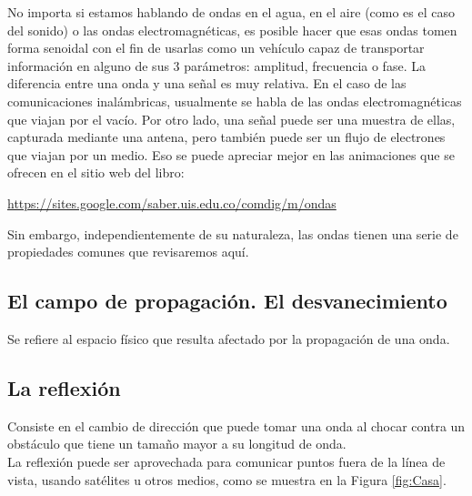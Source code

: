No importa si estamos hablando de ondas en el agua, en el aire (como es el caso del sonido) o las ondas electromagnéticas, es posible hacer que esas ondas tomen forma senoidal con el fin de usarlas como un vehículo capaz de transportar información en alguno de sus 3 parámetros: amplitud, frecuencia o fase. La diferencia entre una onda y una señal es muy relativa. En el caso de las comunicaciones inalámbricas, usualmente se habla de las ondas electromagnéticas que viajan por el vacío. Por otro lado, una señal puede ser una muestra de ellas, capturada mediante una antena, pero también puede ser un flujo de electrones que viajan por un medio. Eso se puede apreciar mejor en las animaciones que se ofrecen en el sitio web del libro: \\

\begin{center}
\url{https://sites.google.com/saber.uis.edu.co/comdig/m/ondas} 
\end{center}

Sin embargo, independientemente de su naturaleza, las ondas tienen una serie de propiedades comunes que revisaremos aquí. \\ 

\subsection{El campo de propagación. El desvanecimiento}
Se refiere al espacio físico que resulta afectado por la propagación de una onda.

\subsection{La reflexión}
Consiste en el cambio de dirección que puede tomar una onda al chocar contra un obstáculo que tiene un tamaño mayor a su longitud de onda. \\

La reflexión puede ser aprovechada para comunicar puntos fuera de la línea de vista, usando satélites u otros medios, como se muestra en la Figura \ref{fig:Casa}.

